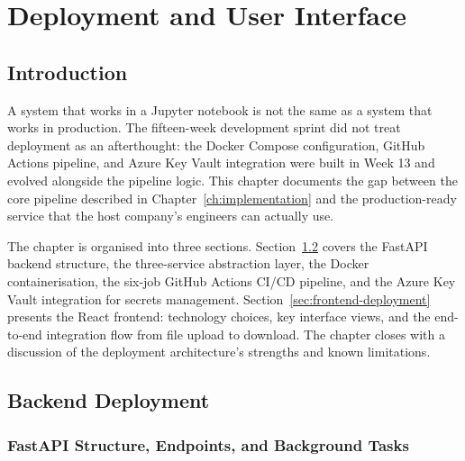 
\chapter{Deployment and User Interface}
\label{ch:deployment}

\section{Introduction}
\label{sec:ch6-intro}

A system that works in a Jupyter notebook is not the same as a system that
works in production. The fifteen-week development sprint did not treat deployment
as an afterthought: the Docker Compose configuration, GitHub Actions pipeline,
and Azure Key Vault integration were built in Week 13 and evolved alongside the
pipeline logic. This chapter documents the gap between the core pipeline
described in Chapter~\ref{ch:implementation} and the production-ready service
that the host company's engineers can actually use.

The chapter is organised into three sections. Section~\ref{sec:backend-deployment}
covers the FastAPI backend structure, the three-service abstraction layer, the
Docker containerisation, the six-job GitHub Actions CI/CD pipeline, and the
Azure Key Vault integration for secrets management. Section~\ref{sec:frontend-deployment}
presents the React frontend: technology choices, key interface views, and the
end-to-end integration flow from file upload to download. The chapter closes
with a discussion of the deployment architecture's strengths and known
limitations.

\section{Backend Deployment}
\label{sec:backend-deployment}

\subsection{FastAPI Structure, Endpoints, and Background Tasks}
\label{subsec:fastapi-structure}

